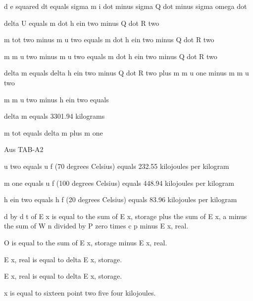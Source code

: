 d e squared dt equals sigma m i dot minus sigma Q dot minus sigma omega dot

delta U equals m dot h ein two minus Q dot R two

m tot two minus m u two equals m dot h ein two minus Q dot R two

m m u two minus m u two equals m dot h ein two minus Q dot R two

delta m equals delta h ein two minus Q dot R two plus m m u one minus m m u two

m m u two minus h ein two equals

delta m equals 3301.94 kilograms

m tot equals delta m plus m one

Aus TAB-A2

u two equals u f (70 degrees Celsius) equals 232.55 kilojoules per kilogram

m one equals u f (100 degrees Celsius) equals 448.94 kilojoules per kilogram

h ein two equals h f (20 degrees Celsius) equals 83.96 kilojoules per kilogram

d by d t of E x is equal to the sum of E x, storage plus the sum of E x, a minus the sum of W n divided by P zero times c p minus E x, real.

O is equal to the sum of E x, storage minus E x, real.

E x, real is equal to delta E x, storage.

E x, real is equal to delta E x, storage.

x is equal to sixteen point two five four kilojoules.